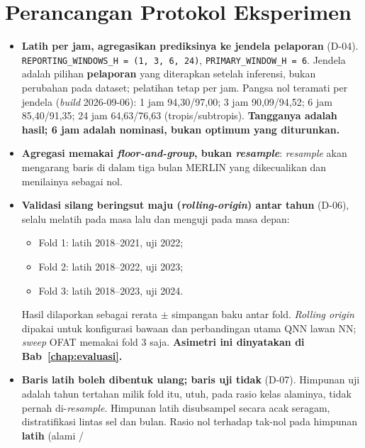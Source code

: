 \section{Perancangan Protokol Eksperimen}


\begin{itemize}
    \item \textbf{Latih per jam, agregasikan prediksinya ke jendela pelaporan}
          (D-04). \texttt{REPORTING\_WINDOWS\_H = (1, 3, 6, 24)},
          \texttt{PRIMARY\_WINDOW\_H = 6}. Jendela adalah pilihan
          \textbf{pelaporan} yang diterapkan setelah inferensi, bukan perubahan
          pada dataset; pelatihan tetap per jam. Pangsa nol teramati per jendela
          (\textit{build} 2026-09-06): 1 jam 94,30/97,00; 3 jam 90,09/94,52;
          6 jam 85,40/91,35; 24 jam 64,63/76,63 (tropis/subtropis).
          \textbf{Tangganya adalah hasil; 6 jam adalah nominasi, bukan optimum
          yang diturunkan.}
    \item \textbf{Agregasi memakai \textit{floor-and-group}, bukan
          \textit{resample}}: \textit{resample} akan mengarang baris di dalam
          tiga bulan MERLIN yang dikecualikan dan menilainya sebagai nol.
    \item \textbf{Validasi silang beringsut maju (\textit{rolling-origin}) antar
          tahun} (D-06), selalu melatih pada masa lalu dan menguji pada masa
          depan:
          \begin{itemize}
              \item Fold 1: latih 2018--2021, uji 2022;
              \item Fold 2: latih 2018--2022, uji 2023;
              \item Fold 3: latih 2018--2023, uji 2024.
          \end{itemize}
          Hasil dilaporkan sebagai rerata $\pm$ simpangan baku antar fold.
          \textit{Rolling origin} dipakai untuk konfigurasi bawaan dan
          perbandingan utama QNN lawan NN; \textit{sweep} OFAT memakai fold 3
          saja. \textbf{Asimetri ini dinyatakan di Bab~\ref{chap:evaluasi}.}
    \item \textbf{Baris latih boleh dibentuk ulang; baris uji tidak} (D-07).
          Himpunan uji adalah tahun tertahan milik fold itu, utuh, pada rasio
          kelas alaminya, tidak pernah di-\textit{resample}. Himpunan latih
          disubsampel secara acak seragam, distratifikasi lintas sel dan bulan.
          Rasio nol terhadap tak-nol pada himpunan \textbf{latih} (alami /

\end{itemize}
